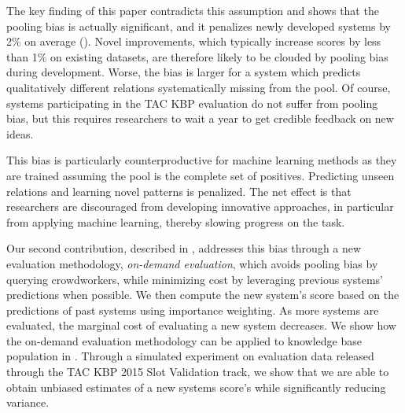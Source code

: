 The key finding of this paper contradicts this assumption and shows that the pooling bias is actually significant, and it penalizes newly developed systems by 2\% \fone{} on average ().
Novel improvements, which typically increase scores by less than 1\% \fone{} on existing datasets, are therefore likely to be clouded by pooling bias during development.
Worse, the bias is larger for a system which predicts qualitatively different relations systematically missing from the pool.
Of course, systems participating in the TAC KBP evaluation do not suffer from pooling bias, but this requires researchers to wait a year to get credible feedback on new ideas.

This bias is particularly counterproductive for machine learning methods as they are trained assuming the pool is the complete set of positives.
Predicting unseen relations and learning novel patterns is penalized.
The net effect is that researchers are discouraged from developing innovative approaches, in particular from applying machine learning, thereby slowing progress on the task. 


Our second contribution, described in , addresses this bias through a new evaluation methodology, \emph{on-demand evaluation},
which avoids pooling bias by querying crowdworkers,
while minimizing cost by leveraging previous systems' predictions when possible.
We then compute the new system's score based on the predictions of past systems using importance weighting.
As more systems are evaluated, the marginal cost of evaluating a new system decreases.
We show how the on-demand evaluation methodology can be applied to knowledge base population in .
Through a simulated experiment on evaluation data released through the TAC KBP 2015 Slot Validation track, we show that we are able to obtain unbiased estimates of a new systems score's while significantly reducing variance.


